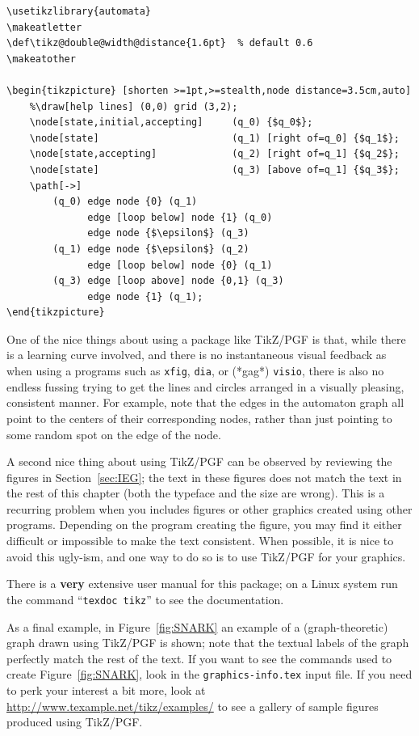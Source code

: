 \begin{verbatim}
\usetikzlibrary{automata}
\makeatletter
\def\tikz@double@width@distance{1.6pt}  % default 0.6
\makeatother

\begin{tikzpicture} [shorten >=1pt,>=stealth,node distance=3.5cm,auto]
    %\draw[help lines] (0,0) grid (3,2);
    \node[state,initial,accepting]     (q_0) {$q_0$};
    \node[state]                       (q_1) [right of=q_0] {$q_1$};
    \node[state,accepting]             (q_2) [right of=q_1] {$q_2$};
    \node[state]                       (q_3) [above of=q_1] {$q_3$};
    \path[->]
        (q_0) edge node {0} (q_1)
              edge [loop below] node {1} (q_0)
              edge node {$\epsilon$} (q_3)
        (q_1) edge node {$\epsilon$} (q_2)
              edge [loop below] node {0} (q_1)
        (q_3) edge [loop above] node {0,1} (q_3)
              edge node {1} (q_1);
\end{tikzpicture}
\end{verbatim}

One of the nice things about using a package like TikZ/PGF is that,
while there is a learning curve involved, and there is no
instantaneous visual feedback as when using a programs such as
\verb|xfig|, \verb|dia|, or (*gag*) \verb|visio|, there is also no
endless fussing trying to get the lines and circles arranged in a
visually pleasing, consistent manner.  For example, note that the
edges in the automaton graph all point to the centers of their
corresponding nodes, rather than just pointing to some random spot
on the edge of the node.

A second nice thing about using TikZ/PGF can be observed by reviewing
the figures in Section~\ref{sec:IEG}; the text in these figures does
not match the text in the rest of this chapter (both the typeface and
the size are wrong).  This is a recurring problem when you includes
figures or other graphics created using other programs.  Depending on
the program creating the figure, you may find it either difficult or
impossible to make the text consistent.  When possible, it is nice to
avoid this ugly-ism, and one way to do so is to use TikZ/PGF for your
graphics.

There is a \textbf{very} extensive user manual for this package; on a
Linux system run the command ``\texttt{texdoc tikz}'' to see the
documentation.

As a final example, in Figure~\ref{fig:SNARK} an example of a
(graph-theoretic) graph drawn using TikZ/PGF is shown; note that the
textual labels of the graph perfectly match the rest of the text.  If
you want to see the commands used to create Figure~\ref{fig:SNARK},
look in the \verb|graphics-info.tex| input file.  If you need to
perk your interest a bit more, look at
\url{http://www.texample.net/tikz/examples/} to see a gallery of
sample figures produced using TikZ/PGF.


